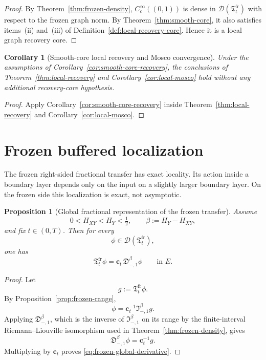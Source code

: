 \documentclass[11pt,a4paper]{amsart}
\theoremstyle{plain}
\newtheorem{proposition}[theorem]{Proposition}
\newtheorem{corollary}[theorem]{Corollary}
\theoremstyle{definition}
\theoremstyle{remark}
\begin{document}
\begin{proof}
By Theorem~\ref{thm:frozen-density}, \(C_c^\infty((0,1))\) is dense in
\(\mathcal D(\mathfrak T_t^{\mathrm{fr}})\) with respect to the frozen graph norm. By
Theorem~\ref{thm:smooth-core}, it also satisfies items~(ii) and~(iii) of
Definition~\ref{def:local-recovery-core}. Hence it is a local graph recovery core.
\end{proof}

\begin{corollary}[Smooth-core local recovery and Mosco convergence]
\label{cor:unconditional-local}
Under the assumptions of Corollary~\ref{cor:smooth-core-recovery}, the conclusions of
Theorem~\ref{thm:local-recovery} and Corollary~\ref{cor:local-mosco} hold without any additional
recovery-core hypothesis.
\end{corollary}

\begin{proof}
Apply Corollary~\ref{cor:smooth-core-recovery} inside
Theorem~\ref{thm:local-recovery} and Corollary~\ref{cor:local-mosco}.
\end{proof}

\section{Frozen buffered localization}\label{sec:frozen-buffer}

The frozen right-sided fractional transfer has exact locality.  Its action inside a boundary layer
depends only on the input on a slightly larger boundary layer.  On the frozen side this localization
is exact, not asymptotic.

\begin{proposition}[Global fractional representation of the frozen transfer]
\label{prop:frozen-global-derivative}
Assume
\[
0<H_{XY}<H_Y<\tfrac12,
\qquad
\beta:=H_Y-H_{XY},
\]
and fix \(t\in(0,T)\). Then for every
\[
\phi\in\mathcal D(\mathfrak T_t^{\mathrm{fr}}),
\]
one has
\begin{equation}\label{eq:frozen-global-derivative}
\mathfrak T_t^{\mathrm{fr}}\phi
=
\mathbf c_t\,\mathfrak D_{-,1}^{\beta}\phi
\qquad\text{in }E.
\end{equation}
\end{proposition}

\begin{proof}
Let
\[
g:=\mathfrak T_t^{\mathrm{fr}}\phi.
\]
By Proposition~\ref{prop:frozen-range},
\[
\phi=\mathbf c_t^{-1}\mathfrak I_{-,1}^{\beta}g.
\]
Applying \(\mathfrak D_{-,1}^{\beta}\), which is the inverse of \(\mathfrak I_{-,1}^{\beta}\) on its
range by the finite-interval Riemann--Liouville isomorphism used in
Theorem~\ref{thm:frozen-density}, gives
\[
\mathfrak D_{-,1}^{\beta}\phi=\mathbf c_t^{-1}g.
\]
Multiplying by \(\mathbf c_t\) proves \eqref{eq:frozen-global-derivative}.
\end{proof}
\end{document}
